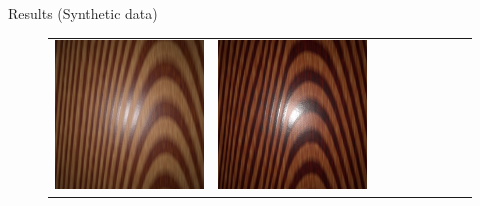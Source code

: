 \documentclass[final]{beamer}
\newlength{\twocolwid}
\newlength{\resultwidth}
\begin{document}
\begin{frame}[t]
\begin{columns}[t]
\begin{column}{\twocolwid}
\begin{block}{Results (Synthetic data)}
\begin{figure}[t]
\begin{tabular}{ccrclcccc}
            		\includegraphics[width=\resultwidth]{synth/wood/good3.jpg} &
            		\includegraphics[width=\resultwidth]{synth/wood//bad1.jpg}
            		\\

\end{tabular}
\end{figure}
\end{block}
\end{column}
\end{columns}
\end{frame}
\end{document}
